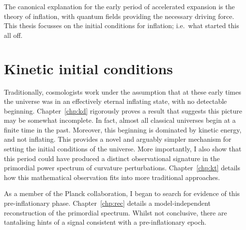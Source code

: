 The canonical explanation for the early period of accelerated expansion is the theory of inflation, with quantum fields providing the necessary driving force. This thesis focusses on the initial conditions for inflation; i.e.\ what started this all off.

\section{Kinetic initial conditions}

Traditionally, cosmologists work under the assumption that at these early times the universe was in an effectively eternal inflating state, with no detectable beginning. Chapter~\ref{chp:kd} rigorously proves a result that suggests this picture may be somewhat incomplete. In fact, almost all classical universes begin at a finite time in the past. Moreover, this beginning is dominated by kinetic energy, and not inflating. This provides a novel and arguably simpler mechanism for setting the initial conditions of the universe. More importantly, I also show that this period could have produced a distinct observational signature in the primordial power spectrum of curvature perturbations. Chapter~\ref{chp:kt} details how this mathematical observation fits into more traditional approaches.

As a member of the Planck collaboration, I began to search for evidence of this pre-inflationary phase. Chapter~\ref{chp:rec} details a model-independent reconstruction of the primordial spectrum. Whilst not conclusive, there are tantalising hints of a signal consistent with a pre-inflationary epoch.

